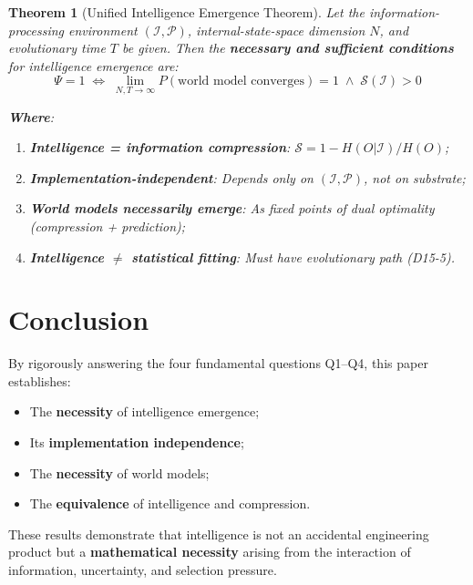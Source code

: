 \documentclass[12pt, a4paper]{article}
\newtheorem{theorem}{Theorem}[section]
\newcommand{\calI}{\mathcal{I}}
\newcommand{\calP}{\mathcal{P}}
\newcommand{\calS}{\mathcal{S}}
\begin{document}
\begin{theorem}[Unified Intelligence Emergence Theorem]\label{thm:unified}
Let the information-processing environment $(\calI,\calP)$, internal-state-space dimension $N$, and evolutionary time $T$ be given. Then the \textbf{necessary and sufficient conditions} for intelligence emergence are:
\begin{equation}\label{eq:unified}
\boxed{\Psi = 1 \;\iff\; \lim_{N,T\to\infty} P(\text{world model converges}) = 1 \;\land\; \calS(\calI) > 0}
\end{equation}

\noindent\textbf{Where}:
\begin{enumerate}
\item \textbf{Intelligence = information compression}: $\calS = 1 - H(O|\calI)/H(O)$;
\item \textbf{Implementation-independent}: Depends only on $(\calI,\calP)$, not on substrate;
\item \textbf{World models necessarily emerge}: As fixed points of dual optimality (compression + prediction);
\item \textbf{Intelligence $\neq$ statistical fitting}: Must have evolutionary path (D15-5).
\end{enumerate}
\end{theorem}

\section*{Conclusion}

By rigorously answering the four fundamental questions Q1--Q4, this paper establishes:
\begin{itemize}
\item The \textbf{necessity} of intelligence emergence;
\item Its \textbf{implementation independence};
\item The \textbf{necessity} of world models;
\item The \textbf{equivalence} of intelligence and compression.
\end{itemize}

\noindent These results demonstrate that intelligence is not an accidental engineering product but a \textbf{mathematical necessity} arising from the interaction of information, uncertainty, and selection pressure.
\end{document}
